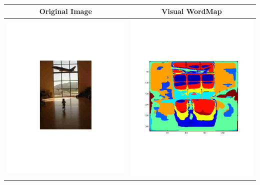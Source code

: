 \documentclass[12pt]{article}
\begin{document}
\begin{longtable}{| c | c |}
  \hline
  Original Image & Visual WordMap \\
  \hline
  \includegraphics[trim=40mm 40mm 40mm 40mm,clip=true,width=0.45\linewidth]{images/airport_1.pdf} & \includegraphics[trim=25mm 25mm 25mm 25mm,clip=true,width=0.45\linewidth]{images/airport_2.pdf} \\
  \hline

\end{longtable}
\end{document}
